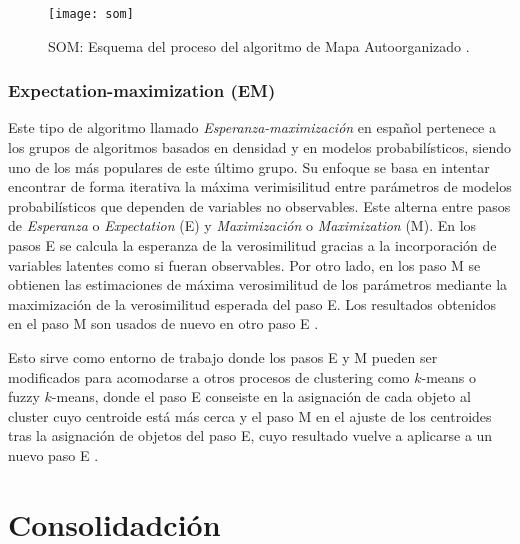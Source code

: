 \documentclass[10pt, a4paper]{article}
\begin{document}
\begin{figure}[ht]
\centering
\texttt{[image: som]}
\caption{SOM: Esquema del proceso del algoritmo de Mapa Autoorganizado \cite{som foto}.}
\label{fig:som}
\end{figure}



\subsubsection{Expectation-maximization (EM)}

Este tipo de algoritmo llamado \textit{Esperanza-maximización} en español pertenece a los grupos de algoritmos basados en densidad y en modelos probabilísticos, siendo uno de los más populares de este último grupo. Su enfoque se basa en intentar encontrar de forma iterativa la máxima verimisilitud entre parámetros de modelos probabilísticos que dependen de variables no observables. Este alterna entre pasos de \textit{Esperanza} o \textit{Expectation} (E) y \textit{Maximización} o \textit{Maximization} (M). En los pasos E se calcula la esperanza de la verosimilitud gracias a la incorporación de variables latentes como si fueran observables. Por otro lado, en los paso M se obtienen las estimaciones de máxima verosimilitud de los parámetros mediante la maximización de la verosimilitud esperada del paso E. Los resultados obtenidos en el paso M son usados de nuevo en otro paso E \cite{em}.

Esto sirve como entorno de trabajo donde los pasos E y M pueden ser modificados para acomodarse a otros procesos de clustering como $k$-means o fuzzy $k$-means, donde el paso E conseiste en la asignación de cada objeto al cluster cuyo centroide está más cerca y el paso M en el ajuste de los centroides tras la asignación de objetos del paso E, cuyo resultado vuelve a aplicarse a un nuevo paso E \cite{LIBRO}.



\section{Consolidadción}
\end{document}

